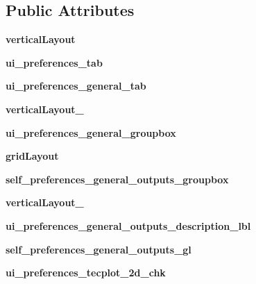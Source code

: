 \subsection*{Public Attributes}
\begin{DoxyCompactItemize}
\item 
\hypertarget{a00107_ad769696a12317c7f92ed3366311bc496}{}\label{a00107_ad769696a12317c7f92ed3366311bc496} 
{\bfseries vertical\+Layout}
\item 
\hypertarget{a00107_aefabfa9bb4d3ece796fee13c167d52fc}{}\label{a00107_aefabfa9bb4d3ece796fee13c167d52fc} 
{\bfseries ui\+\_\+preferences\+\_\+tab}
\item 
\hypertarget{a00107_a0f603694eed0cda9d39a0d9bc19c2e10}{}\label{a00107_a0f603694eed0cda9d39a0d9bc19c2e10} 
{\bfseries ui\+\_\+preferences\+\_\+general\+\_\+tab}
\item 
\hypertarget{a00107_af50058d66700f51fb46a0bab1cf0aa4b}{}\label{a00107_af50058d66700f51fb46a0bab1cf0aa4b} 
{\bfseries vertical\+Layout\+\_}
\item 
\hypertarget{a00107_adca7b98e8183192a5fc165c8695d44f5}{}\label{a00107_adca7b98e8183192a5fc165c8695d44f5} 
{\bfseries ui\+\_\+preferences\+\_\+general\+\_\+groupbox}
\item 
\hypertarget{a00107_a9758be9a7207723c709109813da770fb}{}\label{a00107_a9758be9a7207723c709109813da770fb} 
{\bfseries grid\+Layout}
\item 
\hypertarget{a00107_a2dbc9c7187826d35dfb423e2536031c1}{}\label{a00107_a2dbc9c7187826d35dfb423e2536031c1} 
{\bfseries self\+\_\+preferences\+\_\+general\+\_\+outputs\+\_\+groupbox}
\item 
\hypertarget{a00107_af17928a62255c96603422710076dbede}{}\label{a00107_af17928a62255c96603422710076dbede} 
{\bfseries vertical\+Layout\+\_}
\item 
\hypertarget{a00107_a47018f6a822750d843c3ba200c5dfdd5}{}\label{a00107_a47018f6a822750d843c3ba200c5dfdd5} 
{\bfseries ui\+\_\+preferences\+\_\+general\+\_\+outputs\+\_\+description\+\_\+lbl}
\item 
\hypertarget{a00107_aec77d619b1316cf81f501262151d4388}{}\label{a00107_aec77d619b1316cf81f501262151d4388} 
{\bfseries self\+\_\+preferences\+\_\+general\+\_\+outputs\+\_\+gl}
\item 
\hypertarget{a00107_a99ea63136960e76164e086bee4b6acb5}{}\label{a00107_a99ea63136960e76164e086bee4b6acb5} 
{\bfseries ui\+\_\+preferences\+\_\+tecplot\+\_\+2d\+\_\+chk}
\item 
\hypertarget{a00107_ab28264229e6a9e05bf21541ed645dcb2}{}\label{a00107_ab28264229e6a9e05bf21541ed645dcb2} 

\end{DoxyCompactItemize}
